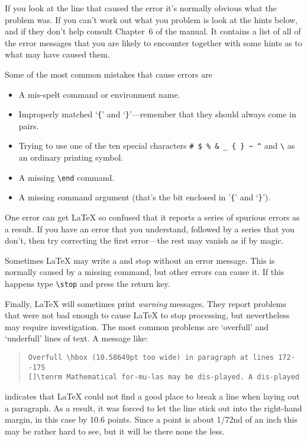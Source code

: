 If you look at the line that caused the error it's normally obvious what the
problem was.  If you can't work out what you problem is look at the hints
below, and if they don't help consult Chapter~6 of the manual.  It contains a
list of all of the error messages that you are likely to encounter together with
some hints as to what may have caused them.

Some of the most common mistakes that cause errors are
\begin{itemize}
\item A mis-spelt command or environment name.
\item Improperly matched `\verb|{|' and `\verb|}|'---remember that they should
 always
come in pairs.
\item Trying to use one of the ten special characters \verb|# $ % & _ { } ~ ^|
and \verb|\| as an ordinary printing symbol.
\item A missing \verb|\end| command.
\item A missing command argument (that's the bit enclosed in '\verb|{|' and
`\verb|}|').
\end{itemize}

One error can get \LaTeX{} so confused that it reports a series of spurious
errors as a result.  If you have an error that you understand, followed by a
series that you don't, then try correcting the first error---the rest
may vanish as if by magic.

Sometimes \LaTeX{} may write a {\tt *} and stop without an error message.  This
is normally caused by a missing \verb|| command, but other errors
can cause it.  If this happens type \verb|\stop| and press the return key.

Finally, \LaTeX{} will sometimes print {\em warning\/} messages.  They report
problems that were not bad enough to cause \LaTeX{} to stop processing, but
nevertheless may require investigation.  The most common problems are
`overfull' and `underfull' lines of text.  A message like:
\begin{quote}\footnotesize\begin{verbatim}
Overfull \hbox (10.58649pt too wide) in paragraph at lines 172--175
[]\tenrm Mathematical for-mu-las may be dis-played. A dis-played
\end{verbatim}\end{quote}
indicates that \LaTeX{} could not find a good place to break a line when laying
out a paragraph.  As a result, it was forced to let the line stick out into the
right-hand margin, in this case by 10.6 points.  Since a point is about 1/72nd
of an inch this may be rather hard to see, but it will be there none the less.


